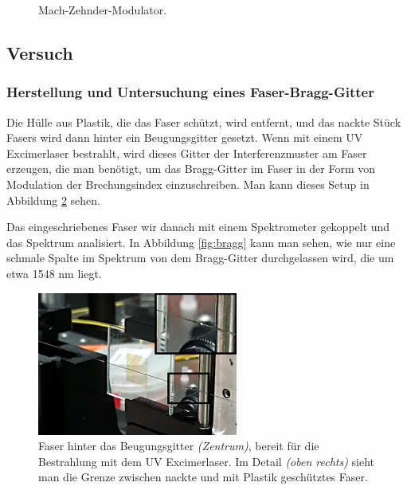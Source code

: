 \documentclass[a4paper]{article}
\begin{document}
\begin{figure}[H]
\begin{tikzpicture}
  \end{tikzpicture}
  \caption{Mach-Zehnder-Modulator.}
  \label{fig:mzm}
\end{figure}

\subsection{Versuch}
\subsubsection{Herstellung und Untersuchung eines Faser-Bragg-Gitter}

Die Hülle aus Plastik, die das Faser schützt, wird entfernt, und das nackte
Stück Fasers wird dann hinter ein Beugungsgitter gesetzt. Wenn mit einem UV
Excimerlaser bestrahlt, wird dieses Gitter der Interferenzmuster am Faser
erzeugen, die man benötigt, um das Bragg-Gitter im Faser in der Form von
Modulation der Brechungsindex einzuschreiben. Man kann dieses Setup in
Abbildung \ref{fig:gitt} sehen. 

Das eingeschriebenes Faser wir danach mit einem Spektrometer gekoppelt und
das Spektrum analisiert. In Abbildung \ref{fig:bragg} kann man sehen, wie
nur eine schmale Spalte im Spektrum von dem Bragg-Gitter durchgelassen wird,
die um etwa 1548 nm liegt.

\begin{figure}[H]
  \centering
  \includegraphics{./messungen/gitter.png}
  \caption{Faser hinter das Beugungsgitter \emph{(Zentrum)}, bereit für die
  Bestrahlung mit dem UV Excimerlaser. Im Detail \emph{(oben rechts)} sieht man
die Grenze zwischen nackte und mit Plastik geschütztes Faser.}
  \label{fig:gitt}
\end{figure}
\end{document}
